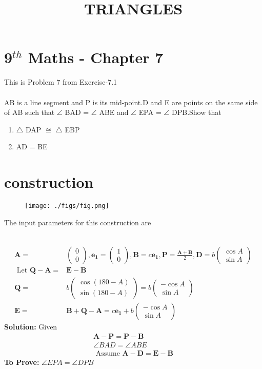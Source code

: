 \documentclass[10pt]{article}
\newcommand{\solution}{\noindent \textbf{Solution: }}
\newcommand{\myvec}[1]{\ensuremath{\begin{pmatrix}#1\end{pmatrix}}}
\let\vec\mathbf{}
\begin{document}
\begin{center}
\title{\textbf{TRIANGLES}}
\date{\vspace{-5ex}} %
\maketitle
\end{center}
\section{9$^{th}$ Maths - Chapter 7}

This is Problem 7 from Exercise-7.1\\\\
AB is a line segment and P is its mid-point.D and E are points on the same side of
AB such that $\angle$ BAD = $\angle$ ABE and $\angle$ EPA = $\angle$ DPB.Show that
\begin{enumerate}
\item $\triangle$ DAP $\cong$ $\triangle$ EBP
\item AD = BE
\end{enumerate}
\section{construction}
\begin{figure}[H]
	\begin{center}
		\texttt{[image: ./figs/fig.png]}
	\end{center}
\caption{}
\label{fig:Fig1}
\end{figure}
The input parameters for this construction are\\
\begin{table}[H]
	\centering
 	
\caption{}
\label{table}
\end{table}\\
\begin{align}
\vec{A}=&\myvec{0\\0},\vec{e_1}=\myvec{1\\0},\vec{B}=c\vec{e_1},\vec{P}=\frac{\vec{A}+\vec{B}}{2},\vec{D}=b\myvec{\cos{A}\\\sin{A}}\\
\text{ Let  }\vec{Q}-\vec{A} =&\vec{E}-\vec{B}\\
\vec{Q}=&b\myvec{\cos{(180-A)}\\\sin{(180-A)}}=b\myvec{-\cos{A}\\\sin{A}}\\
\vec{E}=&\vec{B}+\vec{Q}-\vec{A}=c\vec{e_1}+b\myvec{-\cos{A}\\\sin{A}}
\end{align}
\solution
Given\\
\begin{align}
\vec{A}-\vec{P} = \vec{P}-\vec{B}\\
\angle BAD = \angle ABE\\
\text { Assume  }\vec{A}-\vec{D}=\vec{E}-\vec{B}
\end{align}
\textbf{To Prove:}  $\angle EPA = \angle DPB$
\end{document}
